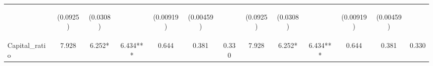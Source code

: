 \documentclass[]{article}
\begin{document}
\begin{center}
\begin{tabular}{lcccccccccccc}
\vspace{4pt} & \begin{footnotesize}(0.0925)\end{footnotesize} & \begin{footnotesize}(0.0308)\end{footnotesize} & \begin{footnotesize}\end{footnotesize} & \begin{footnotesize}(0.00919)\end{footnotesize} & \begin{footnotesize}(0.00459)\end{footnotesize} & \begin{footnotesize}\end{footnotesize} & \begin{footnotesize}(0.0925)\end{footnotesize} & \begin{footnotesize}(0.0308)\end{footnotesize} & \begin{footnotesize}\end{footnotesize} & \begin{footnotesize}(0.00919)\end{footnotesize} & \begin{footnotesize}(0.00459)\end{footnotesize} & \begin{footnotesize}\end{footnotesize} \\
Capital\_ratio & 7.928 & 6.252* & 6.434*** & 0.644 & 0.381 & 0.330 & 7.928 & 6.252* & 6.434*** & 0.644 & 0.381 & 0.330 \\

\end{tabular}
\end{center}
\end{document}
